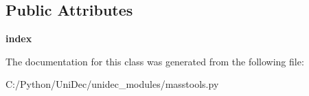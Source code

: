 \subsection*{Public Attributes}
\begin{DoxyCompactItemize}
\item 
\hypertarget{class_uni_dec_1_1unidec__modules_1_1masstools_1_1_test_list_ctrl_match_ae0da8d058ff16ab704a5a378aefedcd7}{}{\bfseries index}\label{class_uni_dec_1_1unidec__modules_1_1masstools_1_1_test_list_ctrl_match_ae0da8d058ff16ab704a5a378aefedcd7}

\end{DoxyCompactItemize}


The documentation for this class was generated from the following file\+:\begin{DoxyCompactItemize}
\item 
C\+:/\+Python/\+Uni\+Dec/unidec\+\_\+modules/masstools.\+py\end{DoxyCompactItemize}
